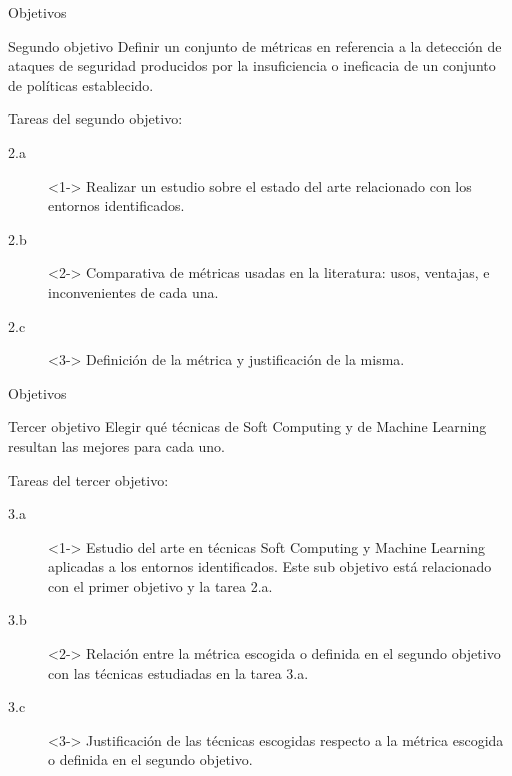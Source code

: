 \documentclass{beamer}
\begin{document}
\begin{frame}{Objetivos}

\begin{block}{Segundo objetivo}
Definir un conjunto de métricas en referencia a la detección de ataques de seguridad producidos por la insuficiencia o ineficacia de un conjunto de políticas establecido.
\end{block}

Tareas del segundo objetivo:

\begin{description}
  \item[2.a]<1-> Realizar un estudio sobre el estado del arte
    relacionado con los entornos identificados. 
  \item[2.b]<2-> Comparativa de métricas usadas en la literatura: usos, ventajas, e inconvenientes de cada una.
  \item[2.c]<3-> Definición de la métrica y justificación de la misma.
\end{description}

\end{frame}

\begin{frame}{Objetivos}

\begin{block}{Tercer objetivo}
Elegir qué técnicas de Soft Computing y de Machine Learning resultan las mejores para cada uno.
\end{block}

Tareas del tercer objetivo:

\begin{small}
\begin{description}
  \item[3.a]<1-> Estudio del arte en técnicas Soft Computing y Machine Learning aplicadas a los entornos identificados. Este sub objetivo está relacionado con el primer objetivo y la tarea 2.a.
  \item[3.b]<2-> Relación entre la métrica escogida o definida en el segundo objetivo con las técnicas estudiadas en la tarea 3.a.
  \item[3.c]<3-> Justificación de las técnicas escogidas respecto a la métrica escogida o definida en el segundo objetivo.
\end{description}
\end{small}

\end{frame}
\end{document}
